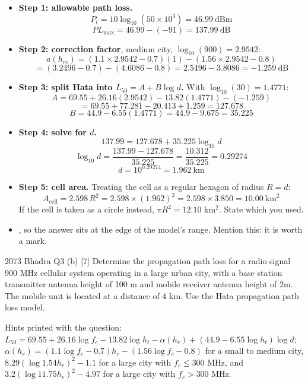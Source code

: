\begin{itemize}
  \item \textbf{Step 1: allowable path loss.}
        \[ P_t = 10\log_{10}(50\times10^{3}) = 46.99\ \text{dBm} \]
        \[ PL_{\max} = 46.99 - (-91) = 137.99\ \text{dB} \]
  \item \textbf{Step 2: correction factor}, medium city, $\log_{10}(900) = 2.9542$:
        \[ a(h_{re}) = (1.1 \times 2.9542 - 0.7)(1) - (1.56 \times 2.9542 - 0.8) \]
        \[ = (3.2496 - 0.7) - (4.6086 - 0.8) = 2.5496 - 3.8086 = \boxed{-1.259\ \text{dB}} \]
  \item \textbf{Step 3: split Hata into $L_{50} = A + B\log d$.} With $\log_{10}(30) = 1.4771$:
        \[ A = 69.55 + 26.16(2.9542) - 13.82(1.4771) - (-1.259) \]
        \[ = 69.55 + 77.281 - 20.413 + 1.259 = 127.678 \]
        \[ B = 44.9 - 6.55(1.4771) = 44.9 - 9.675 = 35.225 \]
  \item \textbf{Step 4: solve for $d$.}
        \[ 137.99 = 127.678 + 35.225\log_{10} d \]
        \[ \log_{10} d = \frac{137.99 - 127.678}{35.225} = \frac{10.312}{35.225} = 0.29274 \]
        \[ d = 10^{0.29274} = \boxed{1.962\ \text{km}} \]
  \item \textbf{Step 5: cell area.} Treating the cell as a regular hexagon of radius $R = d$:
        \[ A_{\text{cell}} = 2.598\,R^2 = 2.598 \times (1.962)^2 = 2.598 \times 3.850
           = \boxed{10.00\ \text{km}^2} \]
        {\color{sub}\footnotesize If the cell is taken as a circle instead,
        $\pi R^2 = 12.10$ km$^2$. State which you used.}
  \item {}, so the answer sits
        at the edge of the model's range. Mention this: it is worth a mark.
\end{itemize}

\hr

{\color{sub}\footnotesize {} }

\begin{asked}{2073 Bhadra \textperiodcentered{} Q3 (b) \textperiodcentered{} [7]}
Determine the propagation path loss for a radio signal 900 MHz cellular system operating in a
large urban city, with a base station transmitter antenna height of 100 m and mobile receiver
antenna height of 2m. The mobile unit is located at a distance of 4 km. Use the Hata propagation
path loss model.
\par\vspace{1pt}
{\color{sub}Hints printed with the question: $L_{50} = 69.55 + 26.16\log f_c - 13.82\log h_t -
\alpha(h_r) + (44.9 - 6.55\log h_t)\log d$; \ $\alpha(h_r) = (1.1\log f_c - 0.7)h_r -
(1.56\log f_c - 0.8)$ for a small to medium city, $8.29(\log 1.54h_r)^2 - 1.1$ for a large city
with $f_c \le 300$ MHz, and $3.2(\log 11.75h_r)^2 - 4.97$ for a large city with
$f_c > 300$ MHz.}
\end{asked}

